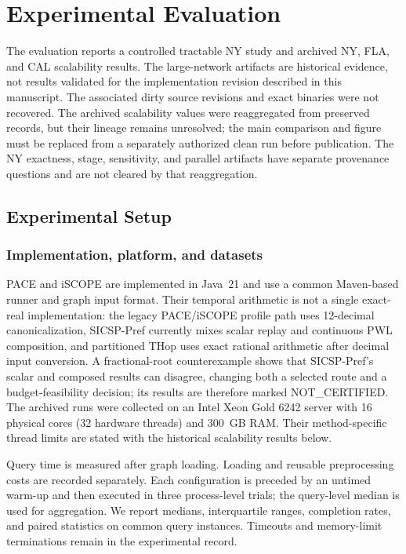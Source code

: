 \documentclass[a4paper,fleqn]{cas-dc}
\begin{document}
\section{Experimental Evaluation}
\label{sec:experiments}

The evaluation reports a controlled tractable NY study and archived NY, FLA, and CAL scalability results. The large-network artifacts are historical evidence, not results validated for the implementation revision described in this manuscript. The associated dirty source revisions and exact binaries were not recovered. The archived scalability values were reaggregated from preserved records, but their lineage remains unresolved; the main comparison and figure must be replaced from a separately authorized clean run before publication. The NY exactness, stage, sensitivity, and parallel artifacts have separate provenance questions and are not cleared by that reaggregation.

\subsection{Experimental Setup}
\label{subsec:exp_setup}

\subsubsection{Implementation, platform, and datasets}

PACE and iSCOPE are implemented in Java~21 and use a common Maven-based runner and graph input format. Their temporal arithmetic is not a single exact-real implementation: the legacy PACE/iSCOPE profile path uses 12-decimal canonicalization, SICSP-Pref currently mixes scalar replay and continuous PWL composition, and partitioned THop uses exact rational arithmetic after decimal input conversion. A fractional-root counterexample shows that SICSP-Pref's scalar and composed results can disagree, changing both a selected route and a budget-feasibility decision; its results are therefore marked NOT_CERTIFIED. The archived runs were collected on an Intel Xeon Gold 6242 server with 16 physical cores (32 hardware threads) and 300~GB RAM. Their method-specific thread limits are stated with the historical scalability results below.

Query time is measured after graph loading. Loading and reusable preprocessing costs are recorded separately. Each configuration is preceded by an untimed warm-up and then executed in three process-level trials; the query-level median is used for aggregation. We report medians, interquartile ranges, completion rates, and paired statistics on common query instances. Timeouts and memory-limit terminations remain in the experimental record.
\end{document}
